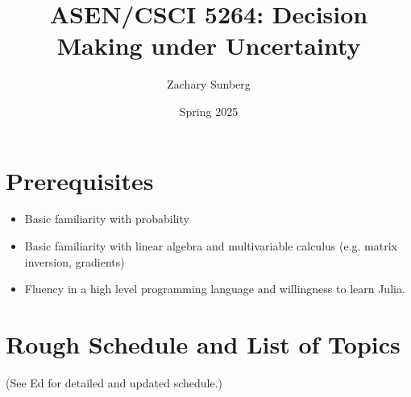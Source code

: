\documentclass[9pt]{article}
\title{ASEN/CSCI 5264: Decision Making under Uncertainty}
\author{Zachary Sunberg}
\date{Spring 2025}
\begin{document}
\maketitle

\section*{Prerequisites}

\begin{itemize}[nosep]
    \item Basic familiarity with probability
    \item Basic familiarity with linear algebra and multivariable calculus (e.g. matrix inversion, gradients)
    \item Fluency in a high level programming language and willingness to learn Julia.
\end{itemize}

\section*{Rough Schedule and List of Topics}

(See Ed for detailed and updated schedule.)
\end{document}
